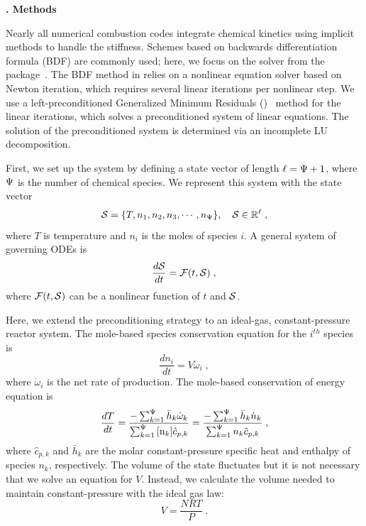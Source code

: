 \documentclass[twocolumn,10pt]{article}
\renewcommand{\section}%
              [1]%
              {%
               \bgroup%
               \flushleft%
               \small\bf%
               \stepcounter{section}%
               \arabic{section}. #1%
               \par%
               \egroup%
              }%
\newcommand{\sectionOne}[1]{\section{#1} \addvspace{10pt}}
\newcommand{\revised}[2]{#1}  %
\begin{document}
\sectionOne{Methods}
\label{p1:methods-section}

Nearly all numerical combustion codes integrate chemical kinetics using implicit methods to handle the stiffness.
Schemes based on backwards differentiation formula (BDF) are commonly used; here, we focus on the \cvodes{} solver from the \sundials{} package~\cite{cohen_cvode_1996, hindmarsh_sundials_2005}.
The BDF method in \cvodes{} relies on a nonlinear equation solver based on Newton iteration, which requires several linear iterations per nonlinear step.
We use a left-preconditioned Generalized Minimum Residuals (\gmres{})~\cite{trefethen_numerical_1997} method for the linear iterations, which solves a preconditioned system of linear equations.
The solution of the preconditioned system is determined via an incomplete LU decomposition.

First, we set up the system by defining a state vector of length $\ell = \nspecies + 1$, where $\nspecies$ is the number of chemical species.
We represent this system with the state vector
\begin{equation}
    \S{} = \{T, n_1, n_2, n_3, \cdots, n_{\nspecies}\},\quad\S{}\in\mathbb{R}^\ell \;,
\end{equation}
where $T$ is temperature and $n_i$ is the moles of species $i$.
A general system of governing ODEs is
\begin{equation}
    \label{eq:ode-system}
    \frac{d\S{}}{dt} = \F{t,\S{}} \;,
\end{equation}
where $\F{t,\S{}}$ can be a nonlinear function of $t$ and $\S{}$.

Here, we extend the preconditioning strategy to an ideal-gas, constant-pressure reactor system.
The mole-based species conservation equation for the $i^{th}$ species is
\begin{equation}
    \label{eq:species-cons}
    \frac{dn_i}{dt} = V \dot{\omega}_{i} \;,
\end{equation}
where $\dot{\omega}_{i}$ is the net rate of production.
The mole-based conservation of energy equation is
\begin{equation}
    \label{eq:mole-energy}
    \frac{dT}{dt} = \frac{-\SpecSum{\bar{h}_k\dot{\omega}_k}}{\SpecSum{\conc{n_k} \hat{c}_{p,k}}} = \frac{-\SpecSum{\bar{h}_k\dot{n}_k}}{ \SpecSum{n_k \hat{c}_{p,k}}}\;,
\end{equation}
where $\hat{c}_{p,k}$ and $\bar{h}_k$ are the molar constant-pressure specific heat and enthalpy of species $n_k$, respectively.
\revised{The volume of the state fluctuates but it is not necessary that we solve an equation for $\dot{V}$. Instead, we calculate the volume needed to maintain constant-pressure with the ideal gas law:
\begin{equation}
    \label{eq:ideal_gas_law}
    V = \frac{NRT}{P} \;.
\end{equation}
}{editor}
\end{document}
